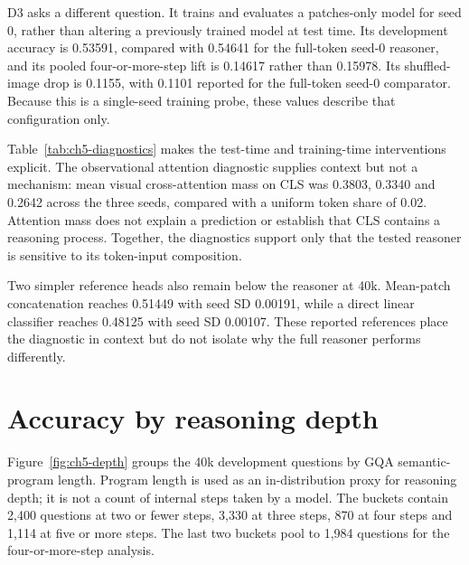 D3 asks a different question. It trains and evaluates a patches-only model
for seed 0, rather than altering a previously trained model at test time. Its
development accuracy is 0.53591, compared with 0.54641 for the full-token
seed-0 reasoner, and its pooled four-or-more-step lift is 0.14617 rather than
0.15978. Its shuffled-image drop is 0.1155, with 0.1101 reported for the
full-token seed-0 comparator. Because this is a single-seed training probe,
these values describe that configuration only.

Table~\ref{tab:ch5-diagnostics} makes the test-time and training-time
interventions explicit. The observational attention diagnostic supplies
context but not a mechanism: mean visual cross-attention mass on CLS was
0.3803, 0.3340 and 0.2642 across the three seeds, compared with a uniform token
share of 0.02. Attention mass does not explain a prediction or establish that
CLS contains a reasoning process. Together, the diagnostics support only that
the tested reasoner is sensitive to its token-input composition.

Two simpler reference heads also remain below the reasoner at 40k. Mean-patch
concatenation reaches 0.51449 with seed SD 0.00191, while a direct linear
classifier reaches 0.48125 with seed SD 0.00107. These reported references
place the diagnostic in context but do not isolate why the full reasoner
performs differently.

\begin{table}[p]
\centering
\caption[Token-input diagnostics at 40k.]{Stored 40k diagnostic values without evaluation-sampling intervals. D2 removes CLS only at test time for seeds 0/1/2. D3 trains and evaluates a patches-only model for seed 0. The standard columns are the corresponding full-token values. These probes test input sensitivity, not an internal reasoning mechanism.}
\label{tab:ch5-diagnostics}
\begingroup\scriptsize\setlength{\tabcolsep}{0.4pt}
\renewenvironment{longtable}[1]{\begin{tabular}{|p{0.15\textwidth}|p{0.10\textwidth}|p{0.045\textwidth}|p{0.09\textwidth}|p{0.09\textwidth}|p{0.085\textwidth}|p{0.09\textwidth}|p{0.09\textwidth}|p{0.10\textwidth}|}}{\end{tabular}}
\let\endhead\relax\renewcommand{\_}{\textunderscore\allowbreak}

\endgroup
\end{table}

\section{Accuracy by reasoning depth}
\label{sec:ch5-depth}
Figure~\ref{fig:ch5-depth} groups the 40k development questions by GQA
semantic-program length. Program length is used as an in-distribution proxy for
reasoning depth; it is not a count of internal steps taken by a model. The
buckets contain 2,400 questions at two or fewer steps, 3,330 at three steps,
870 at four steps and 1,114 at five or more steps. The last two buckets pool to
1,984 questions for the four-or-more-step analysis.

